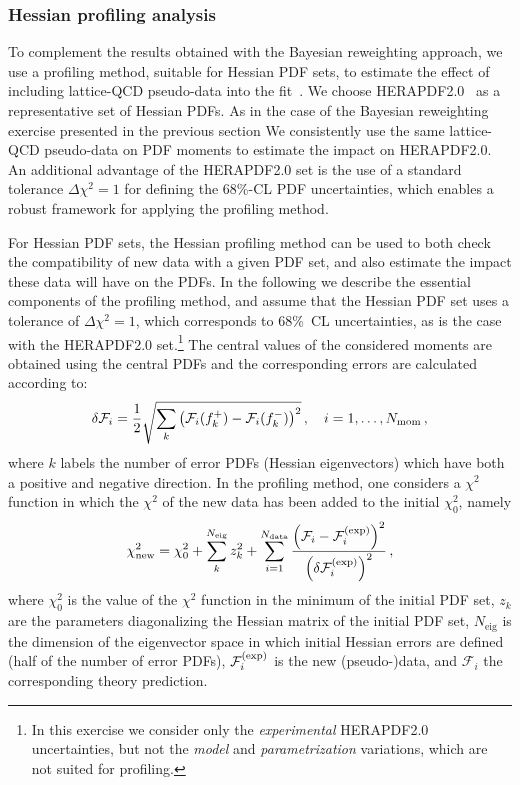 \subsubsection{Hessian profiling analysis}
\label{sec:hessianprofiling}

To complement the results obtained
with the Bayesian reweighting approach,
we use a profiling method, suitable
for Hessian PDF sets, to estimate the effect of including
lattice-QCD pseudo-data into the fit~\cite{Paukkunen:2014zia,Camarda:2015zba}.
%
We choose HERAPDF2.0~\cite{Abramowicz:2015mha}
as a representative set of Hessian PDFs.
%
As in the case of the Bayesian reweighting
exercise presented in the previous section
We consistently use the same lattice-QCD
pseudo-data on PDF moments to estimate the impact on HERAPDF2.0.
%
An additional advantage of the HERAPDF2.0 set is
the use
of a standard tolerance
$\Delta\chi^2=1$ for defining the 68\%-CL PDF
uncertainties,
which enables a robust framework for applying the profiling method. 


For Hessian PDF sets, the Hessian profiling method
can be used to both check the compatibility of new data with a given PDF set,
and also  estimate the impact these data will have on the PDFs. 
In the following we describe the essential components of the profiling method, 
and assume  that the  Hessian PDF set uses a tolerance of $\Delta\chi^2=1$, 
which corresponds to 68\%~CL uncertainties,
as is the case with the HERAPDF2.0 set.\footnote{In this exercise
we consider only the {\it experimental} HERAPDF2.0
uncertainties, but not the {\it model} and {\it parametrization}
variations, which are not suited for profiling.}
%
The central values of the considered moments are obtained using the central PDFs and the corresponding
errors are calculated according to:
\begin{equation}
\delta\mathcal{F}_i = \frac{1}{2} \sqrt{\sum_{k}\left(\mathcal{F}_i(f_k^+)-\mathcal{F}_i(f_k^-)\right)^2}\, ,
\quad i=1,\ldots,N_{\rm mom} \, ,
\end{equation}
where $k$ labels the number of error PDFs (Hessian eigenvectors)
which have both a positive and negative direction.
%
In the profiling method, one considers a $\chi^2$ function in which the $\chi^2$ of the new
data has been added to the initial $\chi^2_0$, namely
\begin{equation}
\label{eq:newchi2}
\chi^2_{\text{new}} = \chi_0^2 + \sum_{k}^{N_{\text{eig}}} z_k^2
                    + \sum_{i=1}^{N_{\text{data}}}
                      \frac{\lp \mathcal{F}_i - \mathcal{F}_i^{\rm(exp)}\rp^2}
                           {\lp\delta\mathcal{F}_i^{\rm(exp)}\rp^2}\,,
\end{equation}
where $\chi^2_0$ is the value of the $\chi^2$ function in the minimum of the initial PDF set,
$z_k$ are the parameters diagonalizing the Hessian matrix of the initial PDF set,
$N_{\text{eig}}$ is the dimension of the eigenvector space in which initial Hessian errors are defined
(half of the number of error PDFs), $\mathcal{F}_i^{\rm(exp)}$ is the new
\hbox{(pseudo-)data},
and $\mathcal{F}_i$ the corresponding theory prediction.

